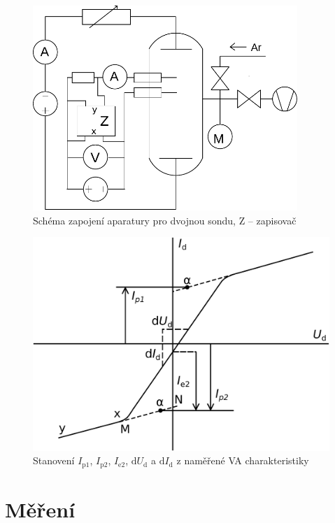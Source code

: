 \documentclass[12pt]{article}
\begin{document}
\begin{figure}[htbp]
\begin{center}
\includegraphics[width=10cm]{schemadvojita.pdf}
\caption{Schéma zapojení aparatury pro dvojnou sondu, Z -- zapisovač}
\label{schemadvojita}
\end{center}
\end{figure}

\begin{figure}[htbp]
\begin{center}
\includegraphics[width=12cm]{sonda2graf.pdf}
\caption{Stanovení $I_\mathrm{p1}$, $I_\mathrm{p2}$, $I_\mathrm{e2}$, $\mathrm{d}U_\mathrm{d}$ a $\mathrm{d}I_\mathrm{d}$ z naměřené VA charakteristiky}
\label{sonda2graf}
\end{center}
\end{figure}

\section{Měření}
\end{document}
